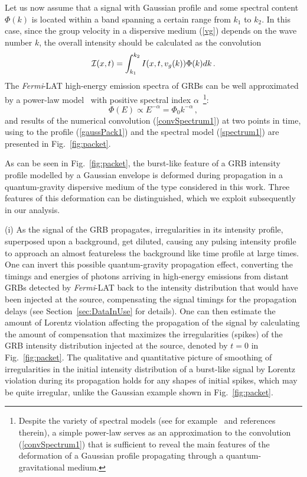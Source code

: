 \documentclass[12pt]{article}
\newcommand{\beq}{\begin{equation}}
\newcommand{\eeq}{\end{equation}}
\begin{document}
Let us now assume that a signal with Gaussian profile and some spectral content $\Phi (k)$ is located
within a band spanning a certain range from $k_1$ to $k_2$.
In this case, since the group velocity in a dispersive medium (\ref{vg}) depends on the wave number $k$, the overall
intensity should be calculated as the convolution
\beq
{\cal I}(x,t) = \int_{k_1}^{k_2}I(x,t,v_g(k))\Phi (k)dk \, .
\label{convSpectrum1}
\eeq
The {\it Fermi}-LAT high-energy emission spectra of GRBs can be well approximated by a power-law
model~\cite{LAT-Cathalog} with positive spectral index $\alpha$~\footnote{Despite the variety of spectral models
(see for example~\cite{LAT-Cathalog} and references therein), a simple power-law serves as an approximation
to the convolution (\ref{convSpectrum1}) that is sufficient to reveal the main features of the deformation of a Gaussian profile propagating
through a quantum-gravitational medium.}:
\beq
\label{spectrum1}
\Phi (E) \propto E^{-\alpha} = \Phi_0k^{-\alpha} \, ,
\eeq
and results of the numerical convolution (\ref{convSpectrum1}) at two points in time, using to the profile
(\ref{gaussPack1}) and the spectral model (\ref{spectrum1}) are presented in Fig.~\ref{fig:packet}.

As can be seen in Fig.~\ref{fig:packet}, the burst-like feature of a GRB intensity profile modelled by a Gaussian
envelope is deformed during propagation in a quantum-gravity dispersive medium of the type considered in this work.
Three features of this deformation can be distinguished, which we exploit subsequently in our
analysis.

(i) As the signal of the GRB propagates, irregularities in its intensity profile, superposed upon a background, get diluted,
causing any pulsing intensity profile to approach an almost featureless the background like time profile at large times.
One can invert this possible quantum-gravity propagation effect, converting
the timings and energies of photons arriving in high-energy emissions from distant GRBs
detected by {\it Fermi}-LAT back to the intensity distribution that would have been injected at the source, compensating the signal timings
for the propagation delays (see Section~\ref{sec:DataInUse} for details).
One can then estimate the amount of Lorentz violation affecting the propagation of the signal by calculating the amount of compensation that
maximizes the irregularities (spikes) of the GRB intensity distribution injected
at the source, denoted by $t=0$ in Fig.~\ref{fig:packet}.
The qualitative and quantitative picture of smoothing of irregularities in the initial intensity distribution
of a burst-like signal by Lorentz violation during its propagation holds for any shapes of  initial spikes, which may be quite irregular, unlike the Gaussian
example shown in Fig.~\ref{fig:packet}.
\end{document}
